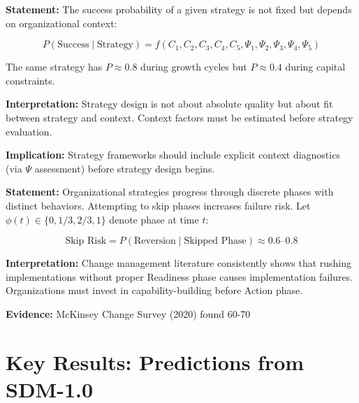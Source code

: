 \begin{tcolorbox}[colback=gray!5!white, colframe=gray!75!black,
    title=Axiom SDM-2: Context Modulation]

\textbf{Statement:} The success probability of a given strategy is not fixed but depends on organizational context:

\begin{equation}
P(\text{Success} \mid \text{Strategy}) = f(C_1, C_2, C_3, C_4, C_5, \Psi_1, \Psi_2, \Psi_3, \Psi_4, \Psi_5)
\end{equation}

The same strategy has $P \approx 0.8$ during growth cycles but $P \approx 0.4$ during capital constraints.

\textbf{Interpretation:} Strategy design is not about absolute quality but about fit between strategy and context. Context factors must be estimated before strategy evaluation.

\textbf{Implication:} Strategy frameworks should include explicit context diagnostics (via $\Psi$ assessment) before strategy design begins.

\end{tcolorbox}

\begin{tcolorbox}[colback=gray!5!white, colframe=gray!75!black,
    title=Axiom SDM-3: Phase Progression]

\textbf{Statement:} Organizational strategies progress through discrete phases with distinct behaviors. Attempting to skip phases increases failure risk. Let $\phi(t) \in \{0, 1/3, 2/3, 1\}$ denote phase at time $t$:

\begin{equation}
\text{Skip Risk} = P(\text{Reversion} \mid \text{Skipped Phase}) \approx 0.6 \text{--} 0.8
\end{equation}

\textbf{Interpretation:} Change management literature consistently shows that rushing implementations without proper Readiness phase causes implementation failures. Organizations must invest in capability-building before Action phase.

\textbf{Evidence:} McKinsey Change Survey (2020) found 60-70%

\end{tcolorbox}

\section{Key Results: Predictions from SDM-1.0}
\label{sec:sdm-results}

